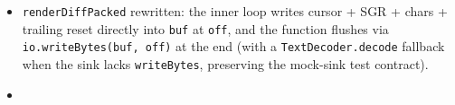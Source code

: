 \begin{itemize}
\begin{itemize}
    \texttt{w\allowbreak{}r\allowbreak{}i\allowbreak{}t\allowbreak{}e\allowbreak{}C\allowbreak{}h\allowbreak{}a\allowbreak{}r\allowbreak{}B\allowbreak{}y\allowbreak{}t\allowbreak{}e\allowbreak{}s\allowbreak{}(\allowbreak{}b\allowbreak{}u\allowbreak{}f\allowbreak{},\allowbreak{} \allowbreak{}o\allowbreak{}f\allowbreak{}f\allowbreak{},\allowbreak{} \allowbreak{}s\allowbreak{}r\allowbreak{}c\allowbreak{}B\allowbreak{}u\allowbreak{}f\allowbreak{},\allowbreak{} \allowbreak{}s\allowbreak{}r\allowbreak{}c\allowbreak{}O\allowbreak{}f\allowbreak{}f\allowbreak{},\allowbreak{} \allowbreak{}s\allowbreak{}i\allowbreak{}d\allowbreak{}e\allowbreak{}T\allowbreak{}a\allowbreak{}b\allowbreak{}l\allowbreak{}e\allowbreak{})} --- inlines ASCII / 2-byte BMP / 3-byte BMP UTF-8 encoding; falls back to \texttt{T\allowbreak{}e\allowbreak{}x\allowbreak{}t\allowbreak{}E\allowbreak{}n\allowbreak{}c\allowbreak{}o\allowbreak{}d\allowbreak{}e\allowbreak{}r\allowbreak{}.\allowbreak{}e\allowbreak{}n\allowbreak{}c\allowbreak{}o\allowbreak{}d\allowbreak{}e\allowbreak{}I\allowbreak{}n\allowbreak{}t\allowbreak{}o} only for side-table graphemes (multi-codepoint clusters).
  \end{itemize}
\item
  \texttt{r\allowbreak{}e\allowbreak{}n\allowbreak{}d\allowbreak{}e\allowbreak{}r\allowbreak{}D\allowbreak{}i\allowbreak{}f\allowbreak{}f\allowbreak{}P\allowbreak{}a\allowbreak{}c\allowbreak{}k\allowbreak{}e\allowbreak{}d} rewritten: the inner loop writes cursor + SGR + chars + trailing reset directly into \texttt{b\allowbreak{}u\allowbreak{}f} at \texttt{o\allowbreak{}f\allowbreak{}f}, and the function flushes via \texttt{i\allowbreak{}o\allowbreak{}.\allowbreak{}w\allowbreak{}r\allowbreak{}i\allowbreak{}t\allowbreak{}e\allowbreak{}B\allowbreak{}y\allowbreak{}t\allowbreak{}e\allowbreak{}s\allowbreak{}(\allowbreak{}b\allowbreak{}u\allowbreak{}f\allowbreak{},\allowbreak{} \allowbreak{}o\allowbreak{}f\allowbreak{}f\allowbreak{})} at the end (with a \texttt{T\allowbreak{}e\allowbreak{}x\allowbreak{}t\allowbreak{}D\allowbreak{}e\allowbreak{}c\allowbreak{}o\allowbreak{}d\allowbreak{}e\allowbreak{}r\allowbreak{}.\allowbreak{}d\allowbreak{}e\allowbreak{}c\allowbreak{}o\allowbreak{}d\allowbreak{}e} fallback when the sink lacks \texttt{w\allowbreak{}r\allowbreak{}i\allowbreak{}t\allowbreak{}e\allowbreak{}B\allowbreak{}y\allowbreak{}t\allowbreak{}e\allowbreak{}s}, preserving the mock-sink test contract).
\item

\end{itemize}
